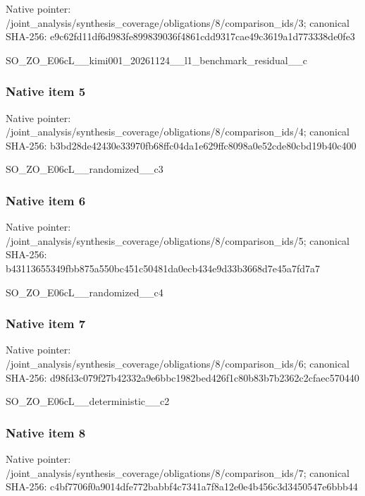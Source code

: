\documentclass[10pt,a4paper]{article}
\begin{document}
Native pointer: /joint\_analysis/synthesi\allowbreak{}s\_coverage/obligations/8\allowbreak{}/comparison\_ids/3; canonical SHA-256: e9c62fd11df6d983fe899839\allowbreak{}036f4861cdd9317cae49c361\allowbreak{}9a1d773338de0fe3


SO\_ZO\_E06cL\_\_kimi001\_202\allowbreak{}61124\_\_l1\_benchmark\_resi\allowbreak{}dual\_\_c


\subsubsection{Native item 5}


Native pointer: /joint\_analysis/synthesi\allowbreak{}s\_coverage/obligations/8\allowbreak{}/comparison\_ids/4; canonical SHA-256: b3bd28de42430e33970fb68f\allowbreak{}fc04da1e629ffc8098a0e52c\allowbreak{}de80cbd19b40c400


SO\_ZO\_E06cL\_\_randomized\_\_c3


\subsubsection{Native item 6}


Native pointer: /joint\_analysis/synthesi\allowbreak{}s\_coverage/obligations/8\allowbreak{}/comparison\_ids/5; canonical SHA-256: b43113655349fbb875a550bc\allowbreak{}451c50481da0ecb434e9d33b\allowbreak{}3668d7e45a7fd7a7


SO\_ZO\_E06cL\_\_randomized\_\_c4


\subsubsection{Native item 7}


Native pointer: /joint\_analysis/synthesi\allowbreak{}s\_coverage/obligations/8\allowbreak{}/comparison\_ids/6; canonical SHA-256: d98fd3c079f27b42332a9e6b\allowbreak{}bc1982bed426f1c80b83b7b2\allowbreak{}362c2cfaec570440


SO\_ZO\_E06cL\_\_deterministic\_\_c2


\subsubsection{Native item 8}


Native pointer: /joint\_analysis/synthesi\allowbreak{}s\_coverage/obligations/8\allowbreak{}/comparison\_ids/7; canonical SHA-256: c4bf7706f0a9014dfe772bab\allowbreak{}bf4c7341a7f8a12e0e4b456c\allowbreak{}3d3450547e6bbb44
\end{document}
